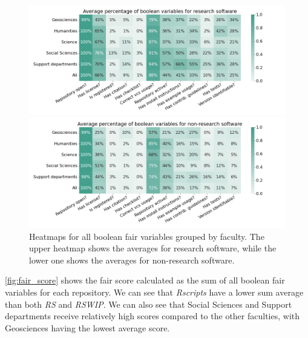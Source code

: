 \begin{figure}[h!]
\centerline{
\includegraphics[scale=0.53]{figures_results/heatmap_fair_booleans.png}}
\vspace{-0.5cm}
\centerline{
\includegraphics[scale=0.53]{figures_results/heatmap_fair_booleans_non_rs.png}}

\caption{Heatmaps for all boolean \acrshort{fair} variables grouped by faculty. The upper heatmap shows the averages for research software, while the lower one shows the averages for non-research software.
\label{fig:heatmap_fair_booleans}}
\end{figure}

\newpage
\autoref{fig:fair_score} shows the \acrshort{fair} score calculated as the sum of all boolean \acrshort{fair} variables for each repository. We can see that \textit{Rscripts} have a lower sum average than both \textit{RS} and \textit{RSWIP}. We can also see that Social Sciences and Support departments receive relatively high scores compared to the other faculties, with Geosciences having the lowest average score.

